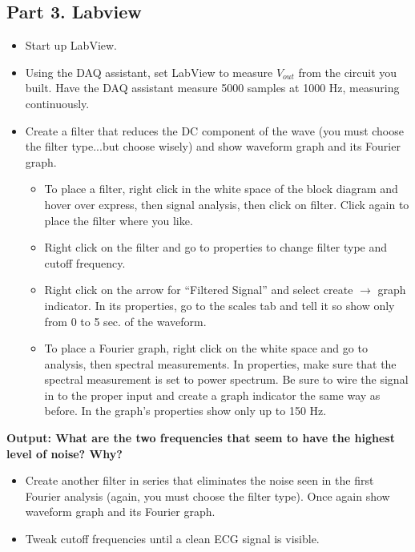 \documentclass[12pt]{article}
\begin{document}
\subsection*{Part 3. Labview}
\begin{itemize}
\item Start up LabView.
\item Using the DAQ assistant, set LabView to measure $V_{out}$ from the circuit you built. 
Have the DAQ assistant measure 5000 samples at 1000 Hz, measuring continuously.
\item Create a filter that reduces the DC component of the wave (you must choose the filter type...but
choose wisely) and show waveform graph and its Fourier graph.
	\begin{itemize}
		\item To place a filter, right click in the white space of the block diagram and hover over express, then signal analysis, then click on filter. Click again to place the filter where you like.
		\item Right click on the filter and go to properties to change filter type and cutoff frequency.
		\item Right click on the arrow for ``Filtered Signal'' and select create $\rightarrow$ graph indicator. In its
properties, go to the scales tab and tell it so show only from 0 to 5 sec. of the waveform.
		\item To place a Fourier graph, right click on the white space and go to analysis, then spectral
measurements. In properties, make sure that the spectral measurement is set to power spectrum. Be sure to wire the signal in to the proper input and create a graph indicator the same way as before. In the graph's properties show only up to 150 Hz.
	\end{itemize}
\end{itemize}
{\textbf{Output: What are the two frequencies that seem to have the highest level of noise? Why?}}

\begin{itemize}
\item Create another filter in series that eliminates the noise seen in the first Fourier analysis (again, you must choose the filter type). Once again show waveform graph and its Fourier graph.
\item Tweak cutoff frequencies until a clean ECG signal is visible.
\end{itemize}

\end{document}
